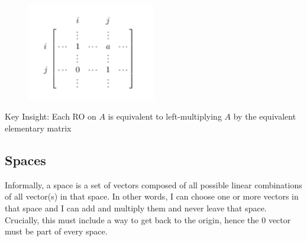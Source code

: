 \documentclass[english,course]{Notes}
\begin{document}
\begin{enumerate}
\begin{figure}[H]
\centering
\includegraphics[width=0.5\textwidth]{ero3.png}
\end{figure}

\end{enumerate}
		
		\par{Key Insight: Each RO on $A$ is equivalent to left-multiplying $A$ by the equivalent elementary matrix}
	      	
		
		 
		
		\subsection{Spaces}
		
	      	
	      	\par{Informally, a space is a set of vectors composed of all possible linear combinations of all vector(s) in that space. In other words, I can choose one or more vectors in that space and I can add and multiply them and never leave that space. Crucially, this must include a way to get back to the origin, hence the $0$ vector must be part of every space.}
	      	
\end{document}

